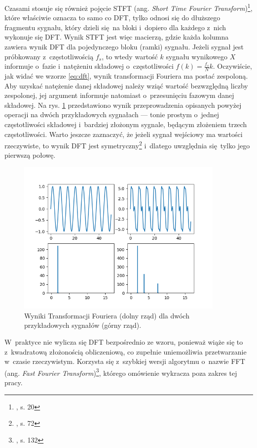 Czasami stosuje się również pojęcie STFT (ang. \emph{Short Time Fourier Transform})\footnote{\cite{lerch_introduction_2012}, s. 20}, które właściwie oznacza to samo co DFT, tylko odnosi się do dłuższego fragmentu sygnału, który dzieli się na bloki i~dopiero dla każdego z~nich wykonuje się DFT. Wynik STFT jest więc macierzą, gdzie każda kolumna zawiera wynik DFT dla pojedynczego bloku (ramki) sygnału. Jeżeli sygnał jest próbkowany z~częstotliwością $f_s$, to wtedy wartość $k$ sygnału wynikowego $X$ informuje o~fazie i~natężeniu składowej o~częstotliwości $f(k) = \frac{f_s}{N}k$.  Oczywiście, jak widać we wzorze \ref{eq:dft}, wynik transformacji Fouriera ma postać zespoloną. Aby uzyskać natężenie danej składowej należy wziąć wartość bezwzględną liczby zespolonej, jej argument informuje natomiast o~przesunięciu fazowym danej składowej. Na rys.  \ref{fig:transformata_fouriera} przedstawiono wynik przeprowadzenia opisanych powyżej operacji na dwóch przykładowych sygnałach --- tonie prostym o~jednej częstotliwości składowej i~bardziej złożonym sygnale, będącym złożeniem trzech częstotliwości. Warto jeszcze zaznaczyć, że jeżeli sygnał wejściowy ma wartości rzeczywiste, to wynik DFT jest symetryczny\footnote{\cite{lyons_wprowadzenie_2000}, s. 72} i~dlatego uwzględnia się tylko jego pierwszą połowę.

\begin{figure}[htb]
    \centering
    \includegraphics[width=0.9\textwidth]{images/transformata_fouriera}
    \caption{Wyniki Transformacji Fouriera (dolny rząd) dla dwóch przykładowych sygnałów (górny rząd).}
    \label{fig:transformata_fouriera}
\end{figure}

W~praktyce nie wylicza się DFT bezpośrednio ze wzoru, ponieważ wiąże się to z~kwadratową złożonością obliczeniową, co zupełnie uniemożliwia przetwarzanie w~czasie rzeczywistym. Korzysta się z~szybkiej wersji algorytmu o~nazwie FFT (ang. \emph{Fast Fourier Transform})\footnote{\cite{lyons_wprowadzenie_2000}, s. 132}, którego omówienie wykracza poza zakres tej pracy.

